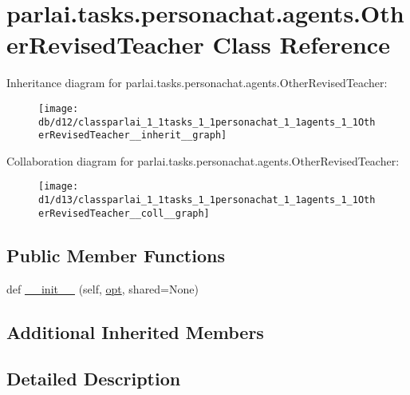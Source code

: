 \hypertarget{classparlai_1_1tasks_1_1personachat_1_1agents_1_1OtherRevisedTeacher}{}\section{parlai.\+tasks.\+personachat.\+agents.\+Other\+Revised\+Teacher Class Reference}
\label{classparlai_1_1tasks_1_1personachat_1_1agents_1_1OtherRevisedTeacher}


Inheritance diagram for parlai.\+tasks.\+personachat.\+agents.\+Other\+Revised\+Teacher\+:
\nopagebreak
\begin{figure}[H]
\begin{center}
\leavevmode
\texttt{[image: db/d12/classparlai\_1\_1tasks\_1\_1personachat\_1\_1agents\_1\_1OtherRevisedTeacher\_\_inherit\_\_graph]}
\end{center}
\end{figure}


Collaboration diagram for parlai.\+tasks.\+personachat.\+agents.\+Other\+Revised\+Teacher\+:
\nopagebreak
\begin{figure}[H]
\begin{center}
\leavevmode
\texttt{[image: d1/d13/classparlai\_1\_1tasks\_1\_1personachat\_1\_1agents\_1\_1OtherRevisedTeacher\_\_coll\_\_graph]}
\end{center}
\end{figure}
\subsection*{Public Member Functions}
\begin{DoxyCompactItemize}
\item 
def \hyperlink{classparlai_1_1tasks_1_1personachat_1_1agents_1_1OtherRevisedTeacher_abb68640d48b19dae6529fb4e90decf78}{\+\_\+\+\_\+init\+\_\+\+\_\+} (self, \hyperlink{classparlai_1_1core_1_1teachers_1_1FbDialogTeacher_af7a9ec497b9cd0292d7b8fa220da7c28}{opt}, shared=None)
\end{DoxyCompactItemize}
\subsection*{Additional Inherited Members}


\subsection{Detailed Description}


